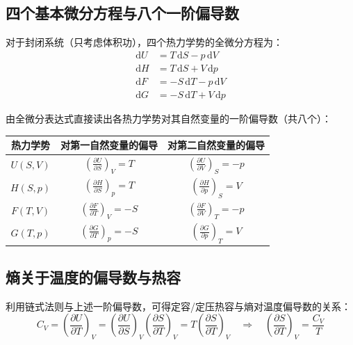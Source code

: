 \documentclass[UTF8]{ctexart}
\begin{document}
\subsection{四个基本微分方程与八个一阶偏导数}

对于封闭系统（只考虑体积功），四个热力学势的全微分方程为：
\begin{align}
  \mathrm{d}U &= T\,\mathrm{d}S - p\,\mathrm{d}V \tag{1}\\[2pt]
  \mathrm{d}H &= T\,\mathrm{d}S + V\,\mathrm{d}p \tag{2}\\[2pt]
  \mathrm{d}F &= -S\,\mathrm{d}T - p\,\mathrm{d}V \tag{3}\\[2pt]
  \mathrm{d}G &= -S\,\mathrm{d}T + V\,\mathrm{d}p \tag{4}
\end{align}

由全微分表达式直接读出各热力学势对其自然变量的一阶偏导数（共八个）：

\begin{center}
\begin{tabular}{c|c|c}
\hline
热力学势 & 对第一自然变量的偏导 & 对第二自然变量的偏导 \\
\hline
$U(S,V)$ & $\displaystyle\left(\frac{\partial U}{\partial S}\right)_V=T$ & $\displaystyle\left(\frac{\partial U}{\partial V}\right)_S=-p$ \\[8pt]
$H(S,p)$ & $\displaystyle\left(\frac{\partial H}{\partial S}\right)_p=T$ & $\displaystyle\left(\frac{\partial H}{\partial p}\right)_S=V$ \\[8pt]
$F(T,V)$ & $\displaystyle\left(\frac{\partial F}{\partial T}\right)_V=-S$ & $\displaystyle\left(\frac{\partial F}{\partial V}\right)_T=-p$ \\[8pt]
$G(T,p)$ & $\displaystyle\left(\frac{\partial G}{\partial T}\right)_p=-S$ & $\displaystyle\left(\frac{\partial G}{\partial p}\right)_T=V$ \\
\hline
\end{tabular}
\end{center}

\subsection{熵关于温度的偏导数与热容}

利用链式法则与上述一阶偏导数，可得定容/定压热容与熵对温度偏导数的关系：
\[
C_V=\left(\frac{\partial U}{\partial T}\right)_V
=\left(\frac{\partial U}{\partial S}\right)_V\left(\frac{\partial S}{\partial T}\right)_V
=T\left(\frac{\partial S}{\partial T}\right)_V
\quad\Longrightarrow\quad
\boxed{\left(\frac{\partial S}{\partial T}\right)_V=\frac{C_V}{T}}
\]
\end{document}
